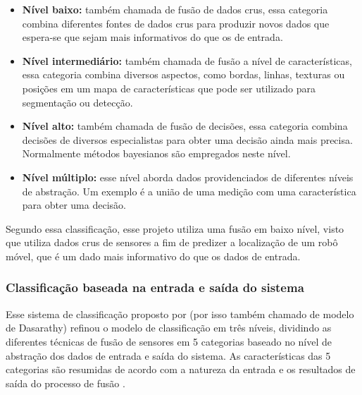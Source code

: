 \documentclass[acronym, symbols, table]{fei}
\begin{document}
				\begin{itemize}
					\item \textbf{Nível baixo:} também chamada de fusão de dados crus, essa categoria combina diferentes fontes de dados crus para produzir novos dados que espera-se que sejam mais informativos do que os de entrada.
					
					\item \textbf{Nível intermediário:} também chamada de fusão a nível de características, essa categoria combina diversos aspectos, como bordas, linhas, texturas ou posições em um mapa de características que pode ser utilizado para segmentação ou detecção.
					
					\item \textbf{Nível alto:} também chamada de fusão de decisões, essa categoria combina decisões de diversos especialistas para obter uma decisão ainda mais precisa. Normalmente métodos bayesianos são empregados neste nível.
					
					\item \textbf{Nível múltiplo:} esse nível aborda dados providenciados de diferentes níveis de abstração. Um exemplo é a união de uma medição com uma característica para obter uma decisão.
				\end{itemize}
				
				Segundo essa classificação, esse projeto utiliza uma fusão em baixo nível, visto que utiliza dados crus de sensores a fim de predizer a localização de um robô móvel, que é um dado mais informativo do que os dados de entrada.
			
			\subsubsection{Classificação baseada na entrada e saída do sistema}
			
				Esse sistema de classificação proposto por \textcite{dasarathy1997sensor} (por isso também chamado de modelo de Dasarathy) refinou o modelo de classificação em três níveis, dividindo as diferentes técnicas de fusão de sensores em 5 categorias baseado no nível de abstração dos dados de entrada e saída do sistema. As características das 5 categorias são resumidas de acordo com a natureza da entrada e os resultados de saída do processo de fusão \cite{li2021data, vakil2021survey}. 
				
\end{document}
